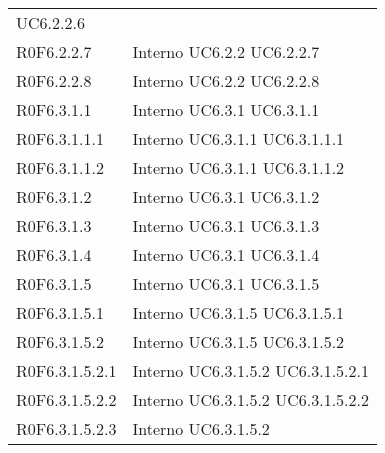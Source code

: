 \begin{longtable}{p{2.5cm}!{\VRule[1pt]}p{2.5cm}}
 \newline UC6.2.2.6
 \\
R0F6.2.2.7 & Interno \newline UC6.2.2
 \newline UC6.2.2.7
 \\
R0F6.2.2.8 & Interno \newline UC6.2.2
 \newline UC6.2.2.8
 \\
R0F6.3.1.1 & Interno \newline UC6.3.1
 \newline UC6.3.1.1
 \\
R0F6.3.1.1.1 & Interno \newline UC6.3.1.1
 \newline UC6.3.1.1.1
 \\
R0F6.3.1.1.2 & Interno \newline UC6.3.1.1
 \newline UC6.3.1.1.2
 \\
R0F6.3.1.2 & Interno \newline UC6.3.1
 \newline UC6.3.1.2
 \\
R0F6.3.1.3 & Interno \newline UC6.3.1
 \newline UC6.3.1.3
 \\
R0F6.3.1.4 & Interno \newline UC6.3.1
 \newline UC6.3.1.4
 \\
R0F6.3.1.5 & Interno \newline UC6.3.1
 \newline UC6.3.1.5
 \\
R0F6.3.1.5.1 & Interno \newline UC6.3.1.5
 \newline UC6.3.1.5.1
 \\
R0F6.3.1.5.2 & Interno \newline UC6.3.1.5
 \newline UC6.3.1.5.2
 \\
R0F6.3.1.5.2.1 & Interno \newline UC6.3.1.5.2
 \newline UC6.3.1.5.2.1
 \\
R0F6.3.1.5.2.2 & Interno \newline UC6.3.1.5.2
 \newline UC6.3.1.5.2.2
 \\
R0F6.3.1.5.2.3 & Interno \newline UC6.3.1.5.2

\end{longtable}
